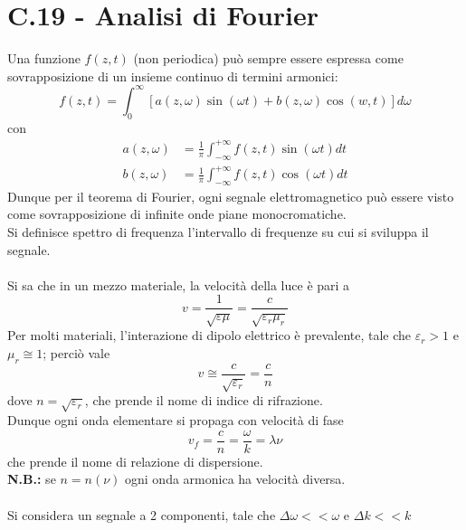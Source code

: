 \documentclass{article}
\begin{document}
\section*{C.19 - Analisi di Fourier}
Una funzione $f(z,t)$ (non periodica) può sempre essere espressa come sovrapposizione di un insieme continuo di termini armonici:
\begin{equation}
    f(z,t)=\int_0^\infty[a(z,\omega)\sin(\omega t)+b(z,\omega)\cos(w,t)]d\omega
    \nonumber
\end{equation}
con 
\begin{equation}
\begin{split}
    a(z,\omega)&=\frac{1}{\pi}\int_{-\infty}^{+\infty} f(z,t)\sin(\omega t)dt \\
    b(z,\omega)&=\frac{1}{\pi}\int_{-\infty}^{+\infty} f(z,t)\cos(\omega t)dt
    \nonumber
\end{split}
\end{equation}
Dunque per il teorema di Fourier, ogni segnale elettromagnetico può essere visto come sovrapposizione di infinite onde piane monocromatiche.\\
Si definisce spettro di frequenza l'intervallo di frequenze su cui si sviluppa il segnale.\\
\\
Si sa che in un mezzo materiale, la velocità della luce è pari a
\begin{equation}
    v=\frac{1}{\sqrt{\varepsilon\mu}}=\frac{c}{\sqrt{\varepsilon_r\mu_r}}
    \nonumber
\end{equation}
Per molti materiali, l’interazione di dipolo elettrico è prevalente, tale che $\varepsilon_r>1$ e $\mu_r\cong1$; perciò vale
\begin{equation}
    v\cong\frac{c}{\sqrt{\varepsilon_r}}=\frac{c}{n}
    \nonumber
\end{equation}
dove $n=\sqrt{\varepsilon_r}$, che prende il nome di indice di rifrazione.\\
Dunque ogni onda elementare si propaga con velocità di fase
\begin{equation}
    v_f=\frac{c}{n}=\frac{\omega}{k}=\lambda\nu
    \nonumber
\end{equation}
che prende il nome di relazione di dispersione.\\
\textbf{N.B.:} se $n = n(\nu)$ ogni onda armonica ha velocità diversa.\\
\\
Si considera un segnale a 2 componenti, tale che $\Delta\omega<<\omega$ e $\Delta k<<k$\\
\end{document}
